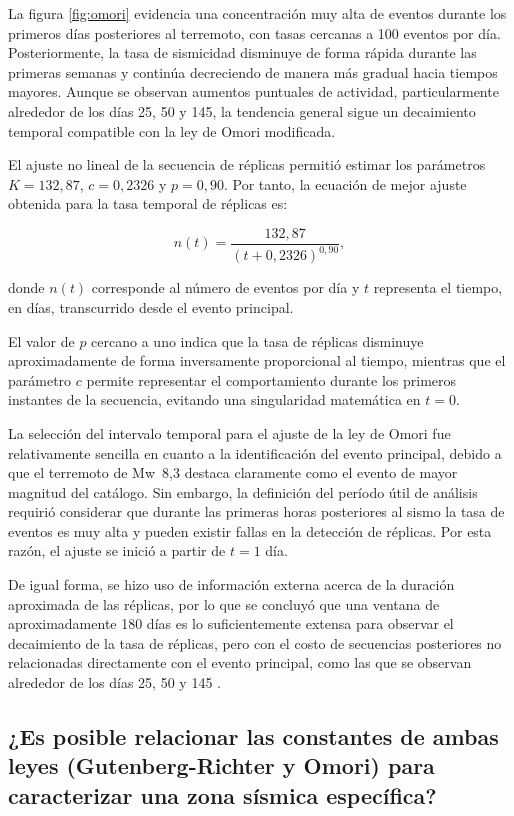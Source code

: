 \documentclass[a4paper,12pt]{article} %
\numberwithin{equation}{section} %
\numberwithin{figure}{section} %
\begin{document}
La figura \ref{fig:omori} evidencia una concentración muy alta de eventos durante los primeros días posteriores al terremoto, con tasas cercanas a 100 eventos por día. Posteriormente, la tasa de sismicidad disminuye de forma rápida durante las primeras semanas y continúa decreciendo de manera más gradual hacia tiempos mayores. Aunque se observan aumentos puntuales de actividad, particularmente alrededor de los días 25, 50 y 145, la tendencia general sigue un decaimiento temporal compatible con la ley de Omori modificada.

El ajuste no lineal de la secuencia de réplicas permitió estimar los parámetros $K = 132{,}87$, $c = 0{,}2326$ y $p = 0{,}90$. Por tanto, la ecuación de mejor ajuste obtenida para la tasa temporal de réplicas es:

\[
n(t) =
\frac{132{,}87}
{\left(t + 0{,}2326\right)^{0{,}90}},
\]

donde $n(t)$ corresponde al número de eventos por día y $t$ representa el tiempo, en días, transcurrido desde el evento principal.

El valor de $p$ cercano a uno indica que la tasa de réplicas disminuye aproximadamente de forma inversamente proporcional al tiempo, mientras que el parámetro $c$ permite representar el comportamiento durante los primeros instantes de la secuencia, evitando una singularidad matemática en $t=0$.

La selección del intervalo temporal para el ajuste de la ley de Omori fue relativamente sencilla en cuanto a la identificación del evento principal, debido a que el terremoto de Mw~8{,}3 destaca claramente como el evento de mayor magnitud del catálogo. Sin embargo, la definición del período útil de análisis requirió considerar que durante las primeras horas posteriores al sismo la tasa de eventos es muy alta y pueden existir fallas en la detección de réplicas. Por esta razón, el ajuste se inició a partir de $t=1$ día.

De igual forma, se hizo uso de información externa acerca de la duración aproximada de las réplicas, por lo que se concluyó que una ventana de aproximadamente 180 días es lo suficientemente extensa para observar el decaimiento de la tasa de réplicas, pero con el costo de secuencias posteriores no relacionadas directamente con el evento principal, como las que se observan alrededor de los días 25, 50 y 145 \cite{Aranguiz_Geotech_Illapel2015}.

\subsection{¿Es posible relacionar las constantes de ambas leyes (Gutenberg-Richter y Omori) para caracterizar una zona sísmica específica?}
\end{document}
